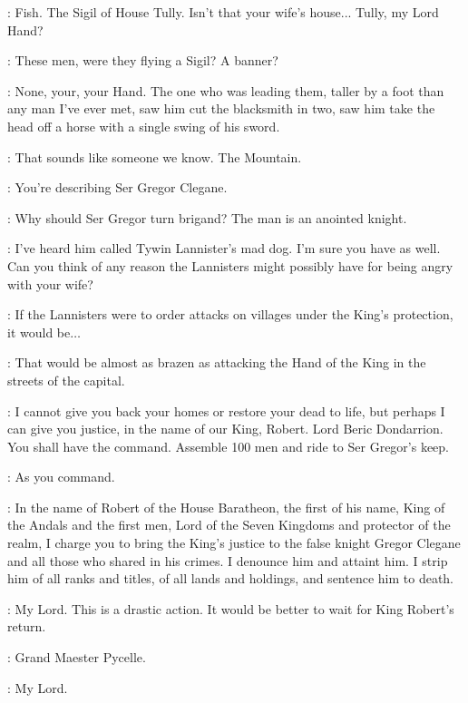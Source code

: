 \LITTLEFINGER: Fish. The Sigil of House Tully.  Isn't that your wife's house... Tully, my Lord Hand?

\NED: These men, were they flying a Sigil? A banner?

\SOUTHERNFARMER:  None, your, your Hand. The one who was leading them, taller by a foot than any man I've ever met, saw him cut the blacksmith in two, saw him take the head off a horse with a single swing of his sword. 

\LITTLEFINGER:  That sounds like someone we know. The Mountain. 

\NED:  You're describing Ser Gregor Clegane. 

\PYCELLE:  Why should Ser Gregor turn brigand? The man is an anointed knight. 

\LITTLEFINGER: I've heard him called Tywin Lannister's mad dog. I'm sure you have as well.  Can you think of any reason the Lannisters might possibly have for being angry with your wife?

\PYCELLE:  If the Lannisters were to order attacks on villages under the King's protection, it would be$\ldots$ 

\LITTLEFINGER:  That would be almost as brazen as attacking the Hand of the King in the streets of the capital. 

\NED: I cannot give you back your homes or restore your dead to life, but perhaps I can give you justice, in the name of our King, Robert. Lord Beric Dondarrion.  You shall have the command. Assemble 100 men and ride to Ser Gregor's keep.

\BERIC:  As you command. 


\NED: In the name of Robert of the House Baratheon, the first of his name, King of the Andals and the first men, Lord of the Seven Kingdoms and protector of the realm, I charge you to bring the King's justice to the false knight Gregor Clegane and all those who shared in his crimes. I denounce him and attaint him.  I strip him of all ranks and titles, of all lands and holdings, and sentence him to death.

\PYCELLE:  My Lord. This is a drastic action. It would be better to wait for King Robert's return.

\NED:  Grand Maester Pycelle. 

\PYCELLE:  My Lord. 

